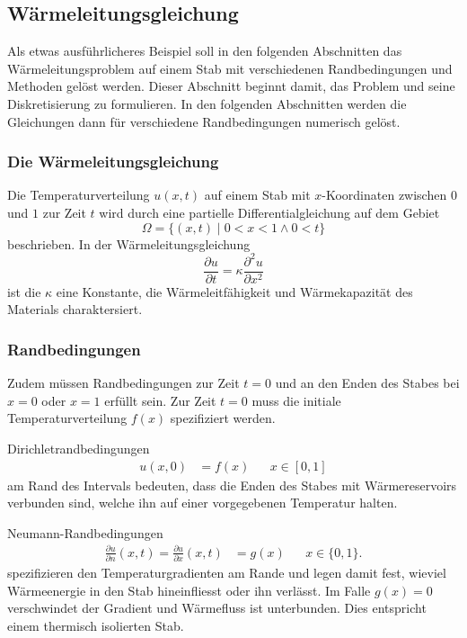 %
%
%
\subsection{Wärmeleitungsgleichung
\label{buch:subsection:waermeleitung}}
Als etwas ausführlicheres Beispiel soll in den folgenden Abschnitten
das Wärmeleitungsproblem auf einem Stab mit verschiedenen Randbedingungen
und Methoden gelöst werden.
%
%
Dieser Abschnitt beginnt damit, das Problem und seine Diskretisierung
zu formulieren.
In den folgenden Abschnitten werden die Gleichungen dann für verschiedene
Randbedingungen numerisch gelöst.

\subsubsection{Die Wärmeleitungsgleichung}
Die Temperaturverteilung $u(x,t)$ auf einem Stab mit $x$-Koordinaten
zwischen $0$ und $1$ zur Zeit $t$ wird durch eine partielle
Differentialgleichung auf dem Gebiet
%
\[
\Omega = \{ (x,t)\;|\; 0 < x < 1\wedge 0<t\}
\]
beschrieben.
In der Wärmeleitungsgleichung
\begin{equation}
\frac{\partial u}{\partial t}
=
\kappa\frac{\partial^2 u}{\partial x^2}
\label{buch:pde:waerme:gleichung}
\end{equation}
ist die $\kappa$ eine Konstante, die Wärmeleitfähigkeit und
Wärmekapazität des Materials charaktersiert.
%
%

\subsubsection{Randbedingungen}
Zudem müssen Randbedingungen zur Zeit $t=0$ und an den Enden
des Stabes bei $x=0$ oder $x=1$ erfüllt sein.
%
Zur Zeit $t=0$ muss die initiale Temperaturverteilung $f(x)$ 
spezifiziert werden.
%

Dirichletrandbedingungen
\[
\begin{aligned}
u(x,0)&=f(x)&&x\in[0,1]
\end{aligned}
\]
am Rand des Intervals bedeuten, dass die Enden des Stabes mit Wärmereservoirs
verbunden sind, welche ihn auf einer vorgegebenen Temperatur halten.
%

Neumann-Randbedingungen
\[
\begin{aligned}
\frac{\partial u}{\partial n}(x,t)=\frac{\partial u}{\partial x}(x,t)&=g(x)&&x\in \{0,1\}.
\end{aligned}
\]
spezifizieren den Temperaturgradienten am Rande und legen damit fest,
wieviel Wärmeenergie in den Stab hineinfliesst oder ihn verlässt.
%
Im Falle $g(x)=0$ verschwindet der Gradient und Wärmefluss ist unterbunden.
Dies entspricht einem thermisch isolierten Stab.
%

